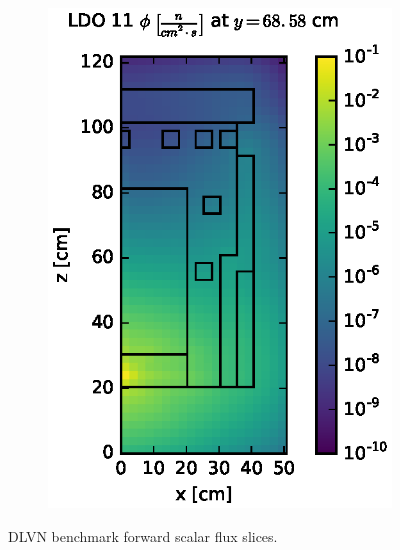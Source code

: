 \begin{figure}[!htb]
\begin{subfigure}{0.4\textwidth}
\includegraphics[max height=0.445\textheight]
{img/dlvn-plots/fwd/flux-ldo11-slice.eps}
\end{subfigure}
\caption{DLVN benchmark forward scalar flux slices.}
\label{dlvn-fwd-slices}
\end{figure}

